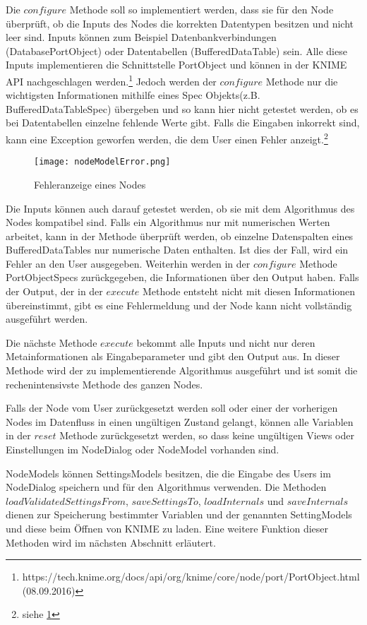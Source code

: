 Die $configure$ Methode soll so implementiert werden, dass sie für den Node überprüft, ob die Inputs des Nodes die korrekten Datentypen besitzen und nicht leer sind. 
Inputs können zum Beispiel Datenbankverbindungen (DatabasePortObject) oder Datentabellen (BufferedDataTable) sein. Alle diese Inputs implementieren die Schnittstelle PortObject und können in der KNIME API nachgeschlagen werden.\footnote{https://tech.knime.org/docs/api/org/knime/core/node/port/PortObject.html (08.09.2016)}
Jedoch werden der $configure$ Methode nur die wichtigsten Informationen mithilfe eines Spec Objekts(z.B. BufferedDataTableSpec) übergeben und so kann hier nicht getestet werden, ob es bei Datentabellen einzelne fehlende Werte gibt.
Falls die Eingaben inkorrekt sind, kann eine Exception geworfen werden, die dem User einen Fehler anzeigt.\footnote{siehe \ref{img:nodeModelError}}

\begin{figure}[H]
	\centering
	\texttt{[image: nodeModelError.png]}
	\caption{Fehleranzeige eines Nodes}
	\label{img:nodeModelError}
\end{figure}

Die Inputs können auch darauf getestet werden, ob sie mit dem Algorithmus des Nodes kompatibel sind. Falls ein Algorithmus nur mit numerischen Werten arbeitet, kann in der Methode überprüft werden, ob einzelne Datenspalten eines BufferedDataTables nur numerische Daten enthalten. Ist dies der Fall, wird ein Fehler an den User ausgegeben.
Weiterhin werden in der $configure$ Methode PortObjectSpecs zurückgegeben, die Informationen über den Output haben. Falls der Output, der in der $execute$ Methode entsteht nicht mit diesen Informationen übereinstimmt, gibt es eine Fehlermeldung und der Node kann nicht vollständig ausgeführt werden.

Die nächste Methode $execute$ bekommt alle Inputs und nicht nur deren Metainformationen als Eingabeparameter und gibt den Output aus. In dieser Methode wird der zu implementierende Algorithmus ausgeführt und ist somit die rechenintensivste Methode des ganzen Nodes. 

Falls der Node vom User zurückgesetzt werden soll oder einer der vorherigen Nodes im Datenfluss in einen ungültigen Zustand gelangt, können alle Variablen in der $reset$ Methode zurückgesetzt werden, so dass keine ungültigen Views oder Einstellungen im NodeDialog oder NodeModel vorhanden sind. 

NodeModels können SettingsModels besitzen, die die Eingabe des Users im NodeDialog speichern und für den Algorithmus verwenden. Die Methoden $loadValidatedSettingsFrom$, $saveSettingsTo$, $loadInternals$ und $saveInternals$ dienen zur Speicherung bestimmter Variablen und der genannten SettingModels und diese beim Öffnen von KNIME zu laden. Eine weitere Funktion dieser Methoden wird im nächsten Abschnitt erläutert.
